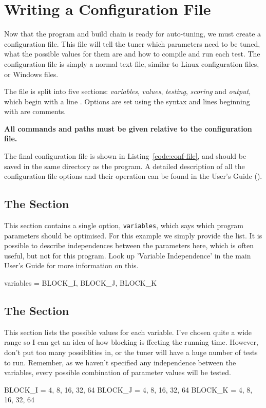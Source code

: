 \documentclass[a4paper]{article}
\begin{document}
\clearpage

\section{Writing a Configuration File}
Now that the program and build chain is ready for auto-tuning, we must create 
a configuration file. 
This file will tell the tuner which parameters need to be tuned, what the 
possible values for them are and how to compile and run each test. 
The configuration file is simply a normal text file, similar to Linux 
configuration files, or Windows  files.

The file is split into five sections: \emph{variables}, \emph{values}, 
\emph{testing}, \emph{scoring} and \emph{output}, which begin with a line 
. Options are set using the syntax
 and lines beginning with \confsnippet{\#} 
are comments. 

\textbf{All commands and paths must be given relative to the configuration 
file.}

The final configuration file is shown in Listing~\ref{code:conf-file}, and 
should be saved in the same directory as the program. A detailed description 
of all the configuration file options and their operation can be found in the 
User's Guide ().


\subsection{The \confsnippet{[variables]} Section}
This section contains a single option, \texttt{variables}, which says which 
program parameters should be optimised. For this example we simply provide 
the list. It is possible to describe independences between the parameters 
here, which is often useful, but not for this program. Look up 
'Variable Independence' in the main User's Guide for more information on 
this.
\begin{Code}[numbers=none]
[variables]

variables = BLOCK_I, BLOCK_J, BLOCK_K
\end{Code}


\subsection{The \confsnippet{[values]} Section}
This section lists the possible values for each variable. I've chosen quite a 
wide range so I can get an idea of how blocking is ffecting the running time. 
However, don't put too many possiblities in, or the tuner will have a huge 
number of tests to run. 
Remember, as we haven't specified any independence between the variables, 
every possible combination of parameter values will be tested.
\begin{Code}[numbers=none]
[values]

BLOCK_I = 4, 8, 16, 32, 64
BLOCK_J = 4, 8, 16, 32, 64
BLOCK_K = 4, 8, 16, 32, 64
\end{Code}
\end{document}

